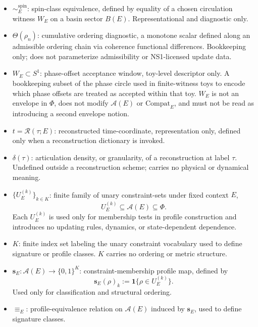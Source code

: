\documentclass[aps,prx,onecolumn,11pt]{revtex4-2}
\theoremstyle{plain}
\theoremstyle{definition}
\theoremstyle{remark}
\begin{document}
\begin{itemize}
\item ${\sim}^{\mathrm{spin}}_E$: spin-class equivalence, defined by
equality of a chosen circulation witness $W_E$ on a basin sector
$B(E)$. Representational and diagnostic only.

\item $\Theta(\rho_n)$: cumulative ordering diagnostic, a monotone
scalar defined along an admissible ordering chain via coherence
functional differences. Bookkeeping only; does not parameterize
admissibility or NS1-licensed update data.

\item $W_E \subset S^1$: phase-offset acceptance window, toy-level
descriptor only. A bookkeeping subset of the phase circle used in
finite-witness toys to encode which phase offsets are treated as
accepted within that toy. $W_E$ is not an envelope in $\Phi$, does not
modify $\mathcal{A}(E)$ or $\mathrm{Compat}_E$, and must not be read as
introducing a second envelope notion.

\item $t = \mathcal{R}(\tau; E)$: reconstructed time-coordinate,
representation only, defined only when a reconstruction dictionary is
invoked.

\item $\delta(\tau)$: articulation density, or granularity, of a
reconstruction at label $\tau$. Undefined outside a reconstruction
scheme; carries no physical or dynamical meaning.

\item $\{U^{(k)}_E\}_{k \in K}$: finite family of unary
constraint-sets under fixed context $E$,
\[
U^{(k)}_E \subseteq \mathcal{A}(E) \subseteq \Phi.
\]
Each $U^{(k)}_E$ is used only for membership tests in profile
construction and introduces no updating rules, dynamics, or
state-dependent dependence.

\item $K$: finite index set labeling the unary constraint vocabulary
used to define signature or profile classes. $K$ carries no ordering
or metric structure.

\item $\mathbf{s}_E : \mathcal{A}(E) \to \{0,1\}^K$:
constraint-membership profile map, defined by
\[
\mathbf{s}_E(\rho)_k :=
\mathbf{1}\{\rho \in U^{(k)}_E\}.
\]
Used only for classification and structural ordering.

\item $\equiv_E$: profile-equivalence relation on
$\mathcal{A}(E)$ induced by $\mathbf{s}_E$, used to define signature
classes.


\end{itemize}
\end{document}
